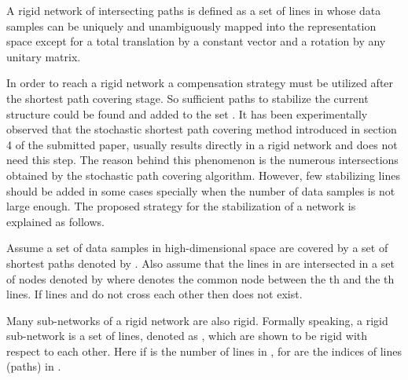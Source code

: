 \documentclass[10pt,journal,cspaper,compsoc]{IEEEtran}
\begin{document}
\begin{framed}
\begin{myDefinition}
A rigid network of intersecting paths is defined as a set of lines in  whose data samples can be uniquely and unambiguously mapped into the representation space except for a total translation by a constant vector and a rotation by any unitary matrix.
\end{myDefinition}
\end{framed}

In order to reach a rigid network a compensation strategy must be utilized after the shortest path covering stage. So sufficient paths to stabilize the current structure could be found and added to the set . It has been experimentally observed that the stochastic shortest path covering method introduced in section 4 of the submitted paper, usually results directly in a rigid network and does not need this step. The reason behind this phenomenon is the numerous intersections obtained by the stochastic path covering algorithm. However, few stabilizing lines should be added in some cases specially when the number of data samples is not large enough. The proposed strategy for the stabilization of a network is explained as follows.

Assume a set of data samples in high-dimensional space are covered by a set of  shortest paths denoted by . Also assume that the lines in  are intersected in a set of nodes denoted by  where  denotes the common node between the th and the th lines. If lines  and  do not cross each other then  does not exist.

Many sub-networks of a rigid network are also rigid. Formally speaking, a rigid sub-network is a set of lines, denoted as ,  which are shown to be rigid with respect to each other. Here if  is the number of lines in ,  for  are the indices of  lines (paths) in .
\end{document}
